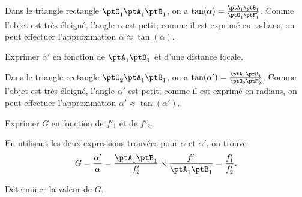 
\begin{corrige}
Dans le triangle rectangle $\ptO_1\ptA_1\ptB_1$, on a $\tan(\alpha)=\frac{{\ptA_1\ptB_1}}{{\ptO_1\ptF'_1}}$. 
Comme l'objet est très éloigné, l'angle $\alpha$ est petit; comme il est exprimé en radians, on peut effectuer l'approximation $\alpha\approx\tan(\alpha)$.
\end{corrige}



\medskip
\begin{enonce}
Exprimer $\alpha'$ en fonction de ${\ptA_1\ptB_1}$ et d'une distance focale.\minusBigskip
	
\end{enonce}


\begin{corrige}
Dans le triangle rectangle $\ptO_2\ptA_1\ptB_1$, on a $\tan(\alpha')=\frac{{\ptA_1\ptB_1}}{{\ptO_2\ptF'_2}}$. 
Comme l'objet est très éloigné, l'angle $\alpha'$ est petit; comme il est exprimé en radians, on peut effectuer l'approximation $\alpha'\approx\tan(\alpha')$.
\end{corrige}



\medskip
\begin{enonce}
Exprimer $G$ en fonction de $f'_1$ et de $f'_2$.\minusBigskip
	
\end{enonce}


\begin{corrige}
En utilisant les deux expressions trouvées pour $\alpha$ et $\alpha'$, on trouve 
\[
G=\frac{\alpha'}{\alpha}=\frac{{\ptA_1\ptB_1}}{f'_2}\times \frac{f'_1}{{\ptA_1\ptB_1}}=\frac{f'_1}{f'_2}.
\]
\end{corrige}



\medskip
\begin{enonce}
Déterminer la valeur de $G$.\minusBigskip
	
\end{enonce}

